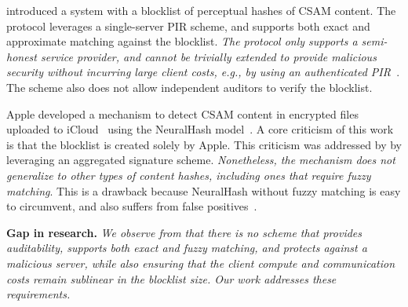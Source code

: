  
%
\citet{kulshrestha2021identifying} introduced a system with a
blocklist of perceptual hashes of CSAM content. The protocol leverages a 
single-server PIR scheme, and supports both exact and approximate matching 
against the blocklist. \emph{The protocol only
supports a semi-honest service provider, and cannot be trivially
extended to provide malicious security without incurring large client costs,
e.g., by using an authenticated PIR~\cite{colombo2023authpir}}. The
scheme also does not allow independent auditors to verify the blocklist.






%
Apple developed a mechanism to detect CSAM content in encrypted files
uploaded to iCloud~\cite{apple2021csam} using the NeuralHash model~\cite{bhowmick2021apple}. 
A core criticism of this work is that the blocklist is created solely by
Apple. This criticism was addressed by \citet{scheffler2023public} by
leveraging an aggregated signature scheme. \emph{Nonetheless, the mechanism does not generalize to other types of content hashes, including ones that require fuzzy matching}. This is a drawback because NeuralHash without fuzzy matching is easy to circumvent, and also suffers from false positives~\cite{struppek2022learning, neuralHashAttack}. 


\noindent\textbf{Gap in research.}
%
\emph{We observe from  that there is no scheme that provides auditability, supports both exact and fuzzy matching, and protects against a malicious server, while also ensuring that the client compute and communication costs remain sublinear in the blocklist size. Our work addresses these requirements.} 
